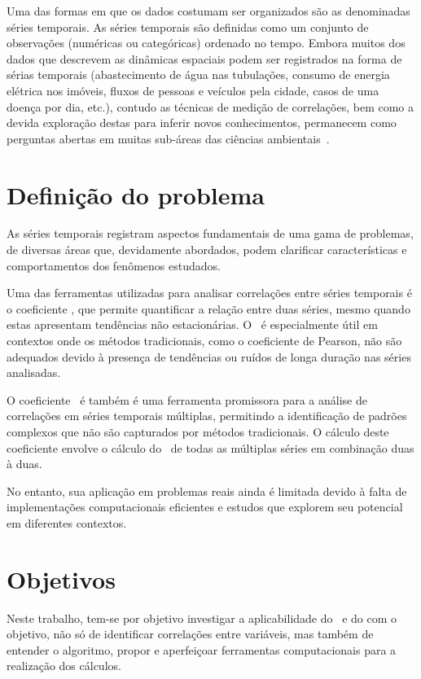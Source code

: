 Uma das formas em que os dados costumam ser organizados são as denominadas séries temporais. As séries temporais são definidas como um conjunto de observações (numéricas ou categóricas) ordenado no tempo.  Embora muitos dos dados que descrevem as dinâmicas espaciais podem ser registrados na forma de sérias temporais (abastecimento de água nas tubulações, consumo de energia elétrica nos imóveis, fluxos de pessoas e veículos pela cidade, casos de uma doença por dia, etc.), contudo as técnicas de medição de correlações, bem como a devida exploração destas para inferir novos conhecimentos, permanecem como perguntas abertas em muitas sub-áreas das ciências ambientais~\cite{Bermudez-Edo2018}.

\section{Definição do problema}
\label{sec:problema}

As séries temporais registram aspectos fundamentais de uma gama de problemas, de diversas áreas que, devidamente abordados, podem clarificar características e comportamentos dos fenômenos estudados.

Uma das ferramentas utilizadas para analisar correlações entre séries temporais é o coeficiente \pdcca, que permite quantificar a relação entre duas séries, mesmo quando estas apresentam tendências não estacionárias. O \pdcca~é especialmente útil em contextos onde os métodos tradicionais, como o coeficiente de Pearson, não são adequados devido à presença de tendências ou ruídos de longa duração nas séries analisadas.

O coeficiente \dmc~é também é uma ferramenta promissora para a análise de correlações em séries temporais múltiplas, permitindo a identificação de padrões complexos que não são capturados por métodos tradicionais. O cálculo deste coeficiente envolve o cálculo do \pdcca~de todas as múltiplas séries em combinação duas à duas.

No entanto, sua aplicação em problemas reais ainda é limitada devido à falta de implementações computacionais eficientes e estudos que explorem seu potencial em diferentes contextos.



\section{Objetivos}
\label{sec:Objetivos}

Neste trabalho, tem-se por objetivo investigar a aplicabilidade do \pdcca~e do \dmc com o objetivo, não só de identificar correlações entre variáveis, mas também de entender o algoritmo, propor e aperfeiçoar ferramentas computacionais para a realização dos cálculos.

